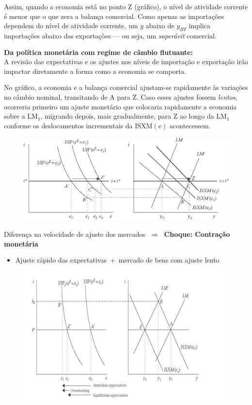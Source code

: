 \documentclass[a4paper,12pt]{article}[abntex2]
\begin{document}
Assim, quando a economia está no ponto Z (gráfico), o nível de atividade corrente
é menor que o que zera a balança comercial.  
Como apenas as importações dependem do nível de atividade corrente,
um $y$ abaixo de $y_{BT}$ implica importações abaixo das exportações — ou seja,
um \textit{superávit} comercial.

\textbf{Da política monetária com regime de câmbio flutuante:}\\
A revisão das expectativas e os ajustes nos níveis de importação e exportação
irão impactar diretamente a forma como a economia se comporta.

No gráfico, a economia e a balança comercial ajustam-se rapidamente às variações
no câmbio nominal, transitando de A para Z.  
Caso esses ajustes fossem \emph{lentos}, ocorreria primeiro um ajuste monetário
que colocaria rapidamente a economia sobre a $\mathrm{LM}_{1}$, migrando depois,
mais gradualmente, para Z ao longo da $\mathrm{LM}_{1}$ conforme os deslocamentos
incrementais da ISXM$(e)$ acontecessem.

\begin{figure}[H]
    \centering
    \includegraphics[width=0.75\linewidth]{Imagens/a23i3.png}
\end{figure}

\noindent Diferença na velocidade de ajuste dos mercados $\;\Rightarrow\;$ \textbf{Choque: Contração monetária}

\begin{itemize}
  \item Ajuste rápido das expectativas \,+\, mercado de bens com ajuste lento
\end{itemize}


\begin{figure}[H]
    \centering
    \includegraphics[width=0.7\linewidth]{Imagens/a23i4.png}
\end{figure}
\end{document}
